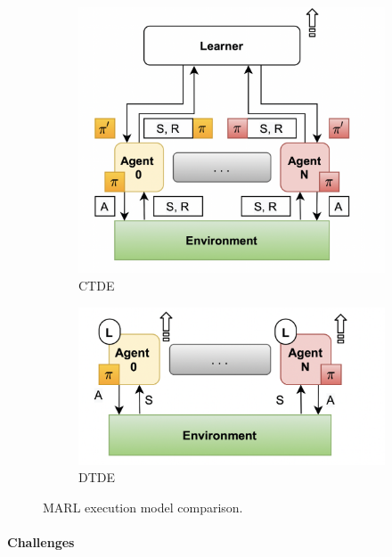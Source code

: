 \documentclass[12pt,a4paper,openright,twoside]{book}
\begin{document}
\begin{figure}[t]
\begin{subfigure}[b]{0.32\textwidth}
        \includegraphics[width=\textwidth]{figures/CTDE.png}
        \caption{CTDE}
        \label{fig:ctde}
    \end{subfigure}
    \begin{subfigure}[b]{0.32\textwidth}
        \centering
        \includegraphics[width=\textwidth]{figures/DTDE.png}
        \caption{DTDE}
        \label{fig:dtde}
    \end{subfigure}
    \caption{MARL execution model comparison.}\vspace{-10pt}
    \label{fig:exmod}
\end{figure}

\paragraph{Challenges}
\end{document}
